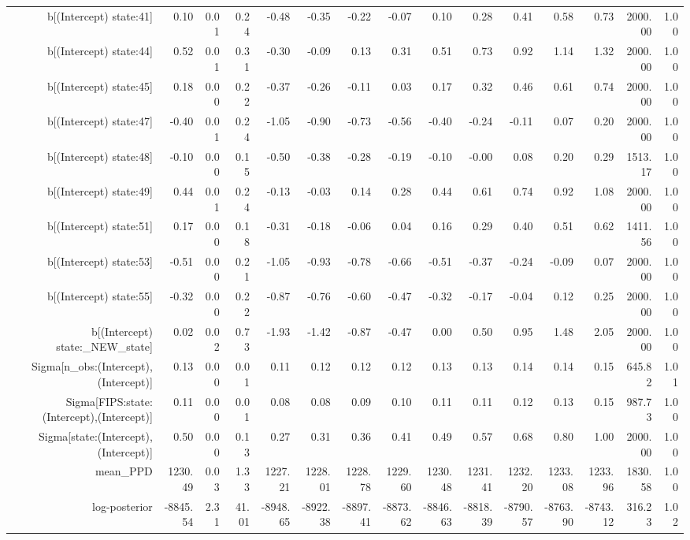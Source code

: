 \begin{table}[ht]
\begin{tabular}{rrrrrrrrrrrrrrr}
  b[(Intercept) state:41] & 0.10 & 0.01 & 0.24 & -0.48 & -0.35 & -0.22 & -0.07 & 0.10 & 0.28 & 0.41 & 0.58 & 0.73 & 2000.00 & 1.00 \\ 
  b[(Intercept) state:44] & 0.52 & 0.01 & 0.31 & -0.30 & -0.09 & 0.13 & 0.31 & 0.51 & 0.73 & 0.92 & 1.14 & 1.32 & 2000.00 & 1.00 \\ 
  b[(Intercept) state:45] & 0.18 & 0.00 & 0.22 & -0.37 & -0.26 & -0.11 & 0.03 & 0.17 & 0.32 & 0.46 & 0.61 & 0.74 & 2000.00 & 1.00 \\ 
  b[(Intercept) state:47] & -0.40 & 0.01 & 0.24 & -1.05 & -0.90 & -0.73 & -0.56 & -0.40 & -0.24 & -0.11 & 0.07 & 0.20 & 2000.00 & 1.00 \\ 
  b[(Intercept) state:48] & -0.10 & 0.00 & 0.15 & -0.50 & -0.38 & -0.28 & -0.19 & -0.10 & -0.00 & 0.08 & 0.20 & 0.29 & 1513.17 & 1.00 \\ 
  b[(Intercept) state:49] & 0.44 & 0.01 & 0.24 & -0.13 & -0.03 & 0.14 & 0.28 & 0.44 & 0.61 & 0.74 & 0.92 & 1.08 & 2000.00 & 1.00 \\ 
  b[(Intercept) state:51] & 0.17 & 0.00 & 0.18 & -0.31 & -0.18 & -0.06 & 0.04 & 0.16 & 0.29 & 0.40 & 0.51 & 0.62 & 1411.56 & 1.00 \\ 
  b[(Intercept) state:53] & -0.51 & 0.00 & 0.21 & -1.05 & -0.93 & -0.78 & -0.66 & -0.51 & -0.37 & -0.24 & -0.09 & 0.07 & 2000.00 & 1.00 \\ 
  b[(Intercept) state:55] & -0.32 & 0.00 & 0.22 & -0.87 & -0.76 & -0.60 & -0.47 & -0.32 & -0.17 & -0.04 & 0.12 & 0.25 & 2000.00 & 1.00 \\ 
  b[(Intercept) state:\_NEW\_state] & 0.02 & 0.02 & 0.73 & -1.93 & -1.42 & -0.87 & -0.47 & 0.00 & 0.50 & 0.95 & 1.48 & 2.05 & 2000.00 & 1.00 \\ 
  Sigma[n\_obs:(Intercept),(Intercept)] & 0.13 & 0.00 & 0.01 & 0.11 & 0.12 & 0.12 & 0.12 & 0.13 & 0.13 & 0.14 & 0.14 & 0.15 & 645.82 & 1.01 \\ 
  Sigma[FIPS:state:(Intercept),(Intercept)] & 0.11 & 0.00 & 0.01 & 0.08 & 0.08 & 0.09 & 0.10 & 0.11 & 0.11 & 0.12 & 0.13 & 0.15 & 987.73 & 1.00 \\ 
  Sigma[state:(Intercept),(Intercept)] & 0.50 & 0.00 & 0.13 & 0.27 & 0.31 & 0.36 & 0.41 & 0.49 & 0.57 & 0.68 & 0.80 & 1.00 & 2000.00 & 1.00 \\ 
  mean\_PPD & 1230.49 & 0.03 & 1.33 & 1227.21 & 1228.01 & 1228.78 & 1229.60 & 1230.48 & 1231.41 & 1232.20 & 1233.08 & 1233.96 & 1830.58 & 1.00 \\ 
  log-posterior & -8845.54 & 2.31 & 41.01 & -8948.65 & -8922.38 & -8897.41 & -8873.62 & -8846.63 & -8818.39 & -8790.57 & -8763.90 & -8743.12 & 316.23 & 1.02 \\ 
   \hline
\end{tabular}
\end{table}
